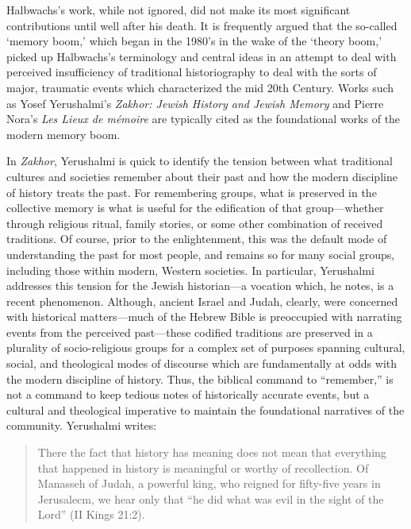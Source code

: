 Halbwachs's work, while not ignored, did not make its most significant
contributions until well after his death. It is frequently argued that
the so-called `memory boom,' which began in the 1980's in the wake of
the `theory boom,' picked up Halbwachs's terminology and central ideas
in an attempt to deal with perceived insufficiency of traditional
historiography to deal with the sorts of major, traumatic events which
characterized the mid 20th
Century.\autocites[1--2]{galinsky_galinsky2016}[See also][29--36. One
cannot help but speculate that---at least in the English-speaking
world---the translation of \emph{The Collective Memory} in 1980
contributed to the popularity of Halbwachs's
terminology.]{olick_olick-etal2011} Works such as Yosef Yerushalmi's
\emph{Zakhor: Jewish History and Jewish Memory} and Pierre Nora's
\emph{Les Lieux de mémoire} are typically cited as the foundational
works of the modern memory
boom.\autocites[112--113]{klein2011}{yerushalmi1989}[Nora's massive
project has been abridged and translated into English as][]{nora1996}

In \emph{Zakhor}, Yerushalmi is quick to identify the tension between
what traditional cultures and societies remember about their past and
how the modern discipline of history treats the past. For remembering
groups, what is preserved in the collective memory is what is useful for
the edification of that group---whether through religious ritual, family
stories, or some other combination of received traditions. Of course,
prior to the enlightenment, this was the default mode of understanding
the past for most people, and remains so for many social groups,
including those within modern, Western societies. In particular,
Yerushalmi addresses this tension for the Jewish historian---a vocation
which, he notes, is a recent phenomenon. Although, ancient Israel and
Judah, clearly, were concerned with historical matters---much of the
Hebrew Bible is preoccupied with narrating events from the perceived
past---these codified traditions are preserved in a plurality of
socio-religious groups for a complex set of purposes spanning cultural,
social, and theological modes of discourse which are fundamentally at
odds with the modern discipline of history. Thus, the biblical command
to ``remember,'' is not a command to keep tedious notes of historically
accurate events, but a cultural and theological imperative to maintain
the foundational narratives of the community. Yerushalmi writes:

\begin{quote}
There the fact that history has meaning does not mean that everything
that happened in history is meaningful or worthy of recollection. Of
Manasseh of Judah, a powerful king, who reigned for fifty-five years in
Jerusalecm, we hear only that ``he did what was evil in the sight of the
Lord'' (II Kings 21:2).\autocite[10]{yerushalmi1989}
\end{quote}

